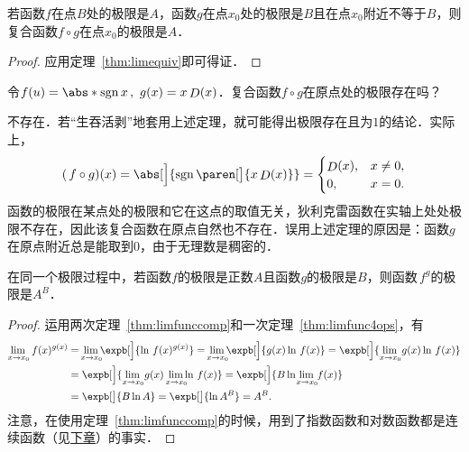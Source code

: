 \begin{theorem}[复合函数的极限]
  \label{thm:limfunccomp}
  若函数\(f\)在点\(B\)处的极限是\(A\)，函数\(g\)在点\(x_0\)处的极限是\(B\)且在点\(x_0\)附近不等于\(B\)，则复合函数\(f \circ g\)在点\(x_0\)的极限是\(A\)．

  \begin{proof}
    应用定理~\ref{thm:limequiv}即可得证．
  \end{proof}
\end{theorem}

\begin{example*}
  令\(f(u) = \abs*{\sgn x}\,,\ g(x) = x \Fn D(x)\)．复合函数\(f \circ g\)在原点处的极限存在吗？

  \begin{remark}
    不存在．若“生吞活剥”地套用上述定理，就可能得出极限存在且为\(1\)的结论．实际上，
    \begin{equation*}
      (\,f \circ g)(x)
      = \abs[\Big]{\sgn\paren[\big]{x \Fn D(x)}} =
      \begin{cases}
        \Fn D(x), & x \ne 0, \\
        0, & x = 0.
      \end{cases}
    \end{equation*}
    函数的极限在某点处的极限和它在这点的取值无关，狄利克雷函数在实轴上处处极限不存在，因此该复合函数在原点自然也不存在．误用上述定理的原因是：函数\(g\)在原点附近总是能取到\(0\)，由于无理数是稠密的．
  \end{remark}
\end{example*}

\begin{theorem}
  \label{thm:limfuncpowexp}
  在同一个极限过程中，若函数\(f\)的极限是正数\(A\)且函数\(g\!\)的极限是\(B\)，则函数\(\,f^g\!\)的极限是\(A^B\)．

  \begin{proof}
    运用两次定理~\ref{thm:limfunccomp}和一次定理~\ref{thm:limfunc4ops}，有
    \begin{align*}
      \lim_{x \to x_0\!} \,f(x)^{g(x)}
      &= {}\smashoperator{\lim_{x \to x_0\!}} \expb[\Big]{\ln \,f(x)^{g(x)}}
        = {}\smashoperator{\lim_{x \to x_0\!}} \expb[\Big]{g(x) \ln \,f(x)}
        = \expb[\Big]{\lim_{x \to x_0\!} g(x) \ln \,f(x)} \\
      &= \expb[\Big]{\lim_{x \to x_0\!} g(x) \smashoperator[r]{\lim_{x \to x_0\!}} \ln \,f(x)}
        = \expb[\Big]{B \ln {}\smashoperator{\lim_{x \to x_0\!}} \,f(x)} \\
      &= \expb[\big]{B \ln A} = \expb[\big]{\ln A^B} = A^B.
    \end{align*}
    注意，在使用定理~\ref{thm:limfunccomp}的时候，用到了指数函数和对数函数都是连续函数（见\hyperref[ch:cont]{下章}）的事实．
  \end{proof}
\end{theorem}

